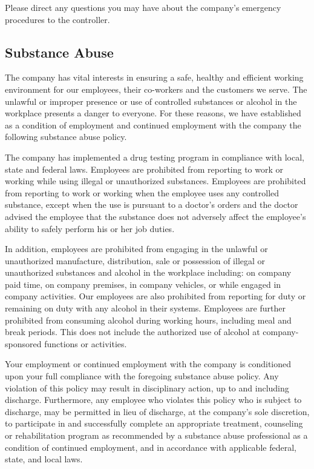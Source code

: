 \documentclass{book}
\begin{document}
Please direct any questions you may have about the company's emergency procedures to the controller.

\subsection{Substance Abuse}

The company has vital interests in ensuring a safe, healthy and efficient working environment for our employees, their co-workers and the customers we serve. The unlawful or improper presence or use of controlled substances or alcohol in the workplace presents a danger to everyone. For these reasons, we have established as a condition of employment and continued employment with the company the following substance abuse policy.

The company has implemented a drug testing program in compliance with local, state and federal laws. Employees are prohibited from reporting to work or working while using illegal or unauthorized substances. Employees are prohibited from reporting to work or working when the employee uses any controlled substance, except when the use is pursuant to a doctor's orders and the doctor advised the employee that the substance does not adversely affect the employee's ability to safely perform his or her job duties.

In addition, employees are prohibited from engaging in the unlawful or unauthorized manufacture, distribution, sale or possession of illegal or unauthorized substances and alcohol in the workplace including: on company paid time, on company premises, in company vehicles, or while engaged in company activities. Our employees are also prohibited from reporting for duty or remaining on duty with any alcohol in their systems. Employees are further prohibited from consuming alcohol during working hours, including meal and break periods. This does not include the authorized use of alcohol at company-sponsored functions or activities.

Your employment or continued employment with the company is conditioned upon your full compliance with the foregoing substance abuse policy. Any violation of this policy may result in disciplinary action, up to and including discharge. Furthermore, any employee who violates this policy who is subject to discharge, may be permitted in lieu of discharge, at the company's sole discretion, to participate in and successfully complete an appropriate treatment, counseling or rehabilitation program as recommended by a substance abuse professional as a condition of continued employment, and in accordance with applicable federal, state, and local laws.
\end{document}
